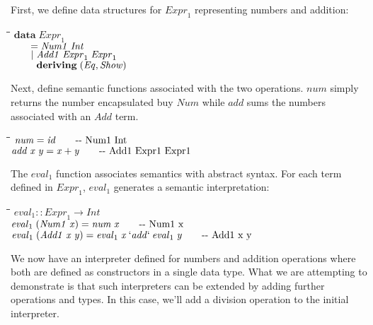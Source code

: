 \documentclass[10pt]{article}
\newlength{\lwidth}\setlength{\lwidth}{4.5cm}
\newlength{\cwidth}\setlength{\cwidth}{8mm} %
\newcommand{\Conid}[1]{\mathit{#1}}
\newcommand{\Varid}[1]{\mathit{#1}}
\begin{document}
First, we define data structures for \ensuremath{\Varid{Expr}_1} representing numbers and
addition:

\begin{tabbing}
\qquad\=\hspace{\lwidth}\=\hspace{\cwidth}\=\+\kill
${\mathbf{data}\;\Varid{Expr}_1}$\\
${\hskip2.00em\relax\mathrel{=}\Conid{Num1}\;\Conid{Int}}$\\
${\hskip2.00em\relax\mid \Conid{Add1}\;\Varid{Expr}_1\;\Varid{Expr}_1}$\\
${\hskip2.00em\relax\phantom{\mid \mbox{}}\mathbf{deriving}\;(\Conid{Eq},\Conid{Show})}$
\end{tabbing}
Next, define semantic functions associated with the two operations.
\ensuremath{\Varid{num}} simply returns the number encapsulated buy \ensuremath{\Conid{Num}} while \ensuremath{\Varid{add}}
sums the numbers associated with an \ensuremath{\Conid{Add}} term.

\begin{tabbing}
\qquad\=\hspace{\lwidth}\=\hspace{\cwidth}\=\+\kill
${\Varid{num}\mathrel{=}\Varid{id}\mbox{\qquad-{}-  Num1 Int}}$\\
${\Varid{add}\;\Varid{x}\;\Varid{y}\mathrel{=}\Varid{x}\mathbin{+}\Varid{y}\mbox{\qquad-{}-  Add1 Expr1 Expr1}}$
\end{tabbing}
The \ensuremath{\Varid{eval}_1} function associates semantics with abstract syntax.  For
each term defined in \ensuremath{\Varid{Expr}_1}, \ensuremath{\Varid{eval}_1} generates a semantic
interpretation:

\begin{tabbing}
\qquad\=\hspace{\lwidth}\=\hspace{\cwidth}\=\+\kill
${\Varid{eval}_1\mathbin{::}\Varid{Expr}_1\to \Conid{Int}}$\\
${\Varid{eval}_1\;(\Conid{Num1}\;\Varid{x})\mathrel{=}\Varid{num}\;\Varid{x}\mbox{\qquad-{}-  Num1 x}}$\\
${\Varid{eval}_1\;(\Conid{Add1}\;\Varid{x}\;\Varid{y})\mathrel{=}\Varid{eval}_1\;\Varid{x}\mathbin{`\Varid{add}`}\Varid{eval}_1\;\Varid{y}\mbox{\qquad-{}-  Add1 x y}}$
\end{tabbing}
We now have an interpreter defined for numbers and addition operations
where both are defined as constructors in a single data type.  What we
are attempting to demonstrate is that such interpreters can be
extended by adding further operations and types.  In this case, we'll
add a division operation to the initial interpreter.
\end{document}

